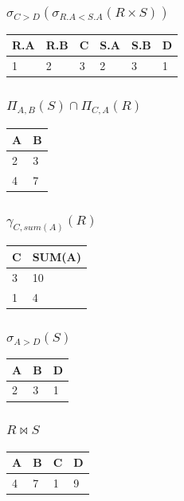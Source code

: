 \documentclass[12pt, a4paper]{article}
\begin{document}
			\subsubsection{$\sigma_{C>D}(\sigma_{R.A<S.A}(R\times S))$}
				\begin{table}[h!]
				\begin{tabular}{|l|l|l|l|l|l|}
				\hline
				R.A & R.B & C & S.A & S.B & D \\ \hline
				1 & 2 & 3 & 2 & 3 & 1\\ \hline
				\end{tabular}
				\end{table}
			\subsubsection{$\Pi_{A,B}(S)\cap \Pi_{C,A}(R)$}
				\begin{table}[h!]
				\begin{tabular}{|l|l|}
				\hline
				A & B \\ \hline
				2 & 3\\ \hline
				4 & 7\\ \hline
				\end{tabular}
				\end{table}
			\subsubsection{$\gamma_{C,sum(A)}(R)$}
				\begin{table}[h!]
				\begin{tabular}{|l|l|}
				\hline
				C & SUM(A) \\ \hline
				3 & 10\\ \hline
				1 & 4\\ \hline
				\end{tabular}
				\end{table}
			\subsubsection{$\sigma_{A>D}(S)$}
				\begin{table}[h!]
				\begin{tabular}{|l|l|l|}
				\hline
				A & B & D \\ \hline
				2 & 3 & 1\\ \hline
				\end{tabular}
				\end{table}
			\clearpage
			\subsubsection{$R\bowtie S$}
				\begin{table}[h!]
				\begin{tabular}{|l|l|l|l|}
				\hline
				A & B & C & D \\ \hline
				4 & 7 & 1 & 9\\ \hline
				\end{tabular}
				\end{table}
\end{document}

